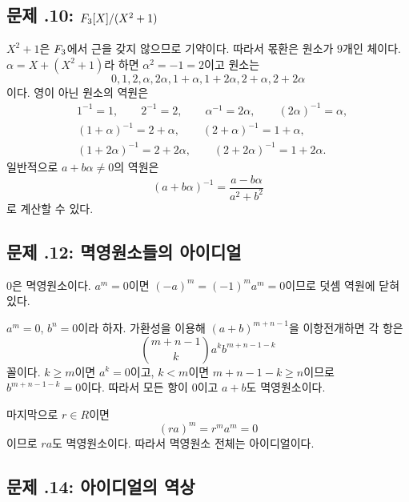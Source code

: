 \subsection*{문제 \thechapter.10: $F_3[X]/(X^2+1)$}

\begin{solution}
$X^2+1$은 $F_3$에서 근을 갖지 않으므로 기약이다. 따라서 몫환은 원소가 $9$개인 체이다. $\alpha=X+(X^2+1)$라 하면 $\alpha^2=-1=2$이고 원소는
\[
  0,1,2,\alpha,2\alpha,1+\alpha,1+2\alpha,
  2+\alpha,2+2\alpha
\]
이다. 영이 아닌 원소의 역원은
\[
\begin{aligned}
&1^{-1}=1,\qquad 2^{-1}=2,\qquad
\alpha^{-1}=2\alpha,\qquad(2\alpha)^{-1}=\alpha,\\
&(1+\alpha)^{-1}=2+\alpha,\qquad
(2+\alpha)^{-1}=1+\alpha,\\
&(1+2\alpha)^{-1}=2+2\alpha,\qquad
(2+2\alpha)^{-1}=1+2\alpha.
\end{aligned}
\]
일반적으로 $a+b\alpha\ne0$의 역원은
\[
  (a+b\alpha)^{-1}=\frac{a-b\alpha}{a^2+b^2}
\]
로 계산할 수 있다.
\end{solution}

\subsection*{문제 \thechapter.12: 멱영원소들의 아이디얼}

\begin{solution}
$0$은 멱영원소이다. $a^m=0$이면 $(-a)^m=(-1)^ma^m=0$이므로 덧셈 역원에 닫혀 있다.

$a^m=0$, $b^n=0$이라 하자. 가환성을 이용해 $(a+b)^{m+n-1}$을 이항전개하면 각 항은
\[
  \binom{m+n-1}{k}a^kb^{m+n-1-k}
\]
꼴이다. $k\ge m$이면 $a^k=0$이고, $k<m$이면 $m+n-1-k\ge n$이므로 $b^{m+n-1-k}=0$이다. 따라서 모든 항이 $0$이고 $a+b$도 멱영원소이다.

마지막으로 $r\in R$이면
\[
  (ra)^m=r^ma^m=0
\]
이므로 $ra$도 멱영원소이다. 따라서 멱영원소 전체는 아이디얼이다.
\end{solution}

\subsection*{문제 \thechapter.14: 아이디얼의 역상}

